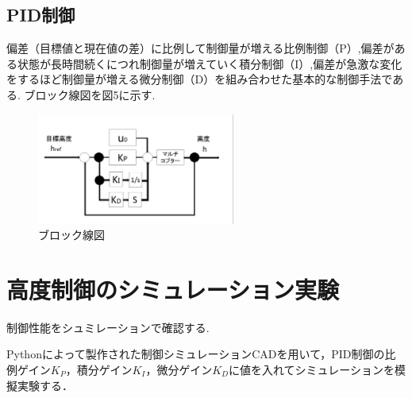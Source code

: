 \documentclass[twocolumn,11pt]{abst}
\begin{document}
\subsection{PID制御}
偏差（目標値と現在値の差）に比例して制御量が増える比例制御（P）,偏差がある状態が長時間続くにつれ制御量が増えていく積分制御（I）,偏差が急激な変化をするほど制御量が増える微分制御（D）を組み合わせた基本的な制御手法である.
ブロック線図を図5に示す.%
\begin{figure}[htbp]
  \begin{center}
   \includegraphics[width=65mm]{img/ブロック図.jpg}
    \end{center}
  \caption{ブロック線図}
 \label{fig:ensyu3tex}
\end{figure}

\section{高度制御のシミュレーション実験}
制御性能をシュミレーションで確認する.

Pythonによって製作された制御シミュレーションCADを用いて，PID制御の比例ゲイン$K_P$，積分ゲイン$K_I$，微分ゲイン$K_D$に値を入れてシミュレーションを模擬実験する．
\end{document}
